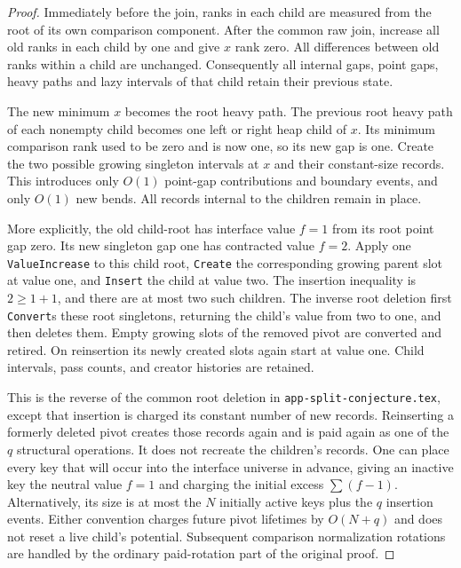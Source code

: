 \documentclass[11pt]{article}
\begin{document}
\begin{proof}
Immediately before the join, ranks in each child are measured from
the root of its own comparison component. After the common raw join,
increase all old ranks in each child by one and give $x$ rank zero.
All differences between old ranks within a child are unchanged.
Consequently all internal gaps, point gaps, heavy paths and lazy
intervals of that child retain their previous state.

The new minimum $x$ becomes the root heavy path. The previous root
heavy path of each nonempty child becomes one left or right heap child
of $x$. Its minimum comparison rank used to be zero and is now one,
so its new gap is one. Create the two possible growing singleton
intervals at $x$ and their constant-size records. This introduces only
$O(1)$ point-gap contributions and boundary events, and only $O(1)$
new bends. All records internal to the children remain in place.

More explicitly, the old child-root has interface value $f=1$ from
its root point gap zero. Its new singleton gap one has contracted
value $f=2$. Apply one \texttt{ValueIncrease} to this child root,
\texttt{Create} the corresponding growing parent slot at value one,
and \texttt{Insert} the child at value two. The insertion inequality
is $2\ge1+1$, and there are at most two such children. The inverse
root deletion first \texttt{Convert}s these root singletons, returning
the child's value from two to one, and then deletes them. Empty
growing slots of the removed pivot are converted and retired. On
reinsertion its newly created slots again start at value one.
Child intervals, pass counts, and creator histories are retained.

This is the reverse of the common root deletion in
\texttt{app-split-conjecture.tex}, except that insertion is charged its
constant number of new records. Reinserting a formerly deleted pivot
creates those records again and is paid again as one of the $q$
structural operations. It does not recreate the children's records.
One can place every key that will occur into the interface universe
in advance, giving an inactive key the neutral value $f=1$ and
charging the initial excess $\sum(f-1)$. Alternatively, its size is
at most the $N$ initially active keys plus the $q$ insertion events.
Either convention charges future pivot lifetimes by $O(N+q)$ and
does not reset a live child's potential.
Subsequent comparison normalization rotations are handled by the
ordinary paid-rotation part of the original proof.
\end{proof}
\end{document}
